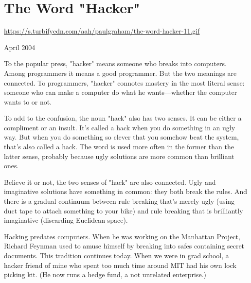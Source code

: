 \chapter{The Word "Hacker"}


            
              
                \href{https://s.turbifycdn.com/aah/paulgraham/the-word-hacker-11.gif}{https://s.turbifycdn.com/aah/paulgraham/the-word-hacker-11.gif}



April 2004

To the popular press, "hacker" means
                  someone who breaks into computers. Among programmers it means
                  a good programmer. But the two meanings are connected. To
                  programmers, "hacker" connotes mastery in the most literal
                  sense: someone who can make a computer do what he
                  wants---whether the computer wants to or not.

To
                  add to the confusion, the noun "hack" also has two senses. It
                  can be either a compliment or an insult. It's called a hack
                  when you do something in an ugly way. But when you do
                  something so clever that you somehow beat the system, that's
                  also called a hack. The word is used more often in the former
                  than the latter sense, probably because ugly solutions are
                  more common than brilliant ones.

Believe it or not,
                  the two senses of "hack" are also connected. Ugly and
                  imaginative solutions have something in common: they both
                  break the rules. And there is a gradual continuum between rule
                  breaking that's merely ugly (using duct tape to attach
                  something to your bike) and rule breaking that is brilliantly
                  imaginative (discarding Euclidean space).

Hacking
                  predates computers. When he was working on the Manhattan
                  Project, Richard Feynman used to amuse himself by breaking
                  into safes containing secret documents. This tradition
                  continues today. When we were in grad school, a hacker friend
                  of mine who spent too much time around MIT had his own lock
                  picking kit. (He now runs a hedge fund, a not unrelated
                  enterprise.)

